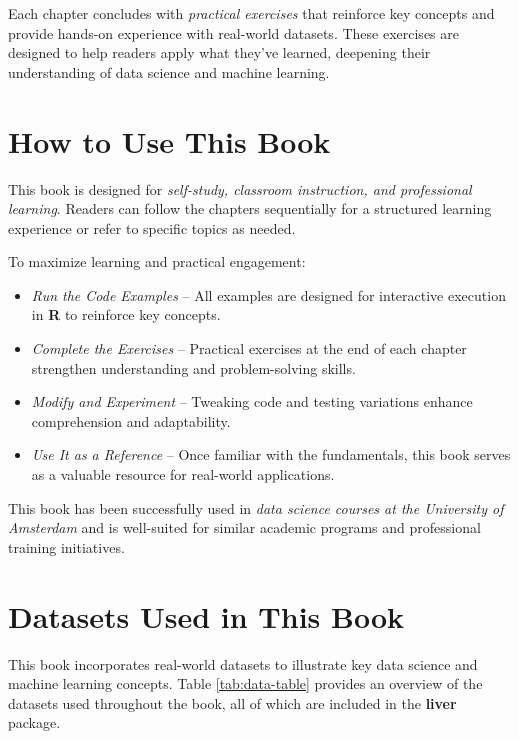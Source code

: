 \documentclass[
]{book}
\providecommand{\tightlist}{%
  \setlength{\itemsep}{0pt}\setlength{\parskip}{0pt}}
\theoremstyle{definition}
\theoremstyle{definition}
\theoremstyle{definition}
\theoremstyle{definition}
\theoremstyle{remark}
\begin{document}
Each chapter concludes with \emph{practical exercises} that reinforce key concepts and provide hands-on experience with real-world datasets. These exercises are designed to help readers apply what they've learned, deepening their understanding of data science and machine learning.

\section*{How to Use This Book}\label{how-to-use-this-book}

This book is designed for \emph{self-study, classroom instruction, and professional learning}. Readers can follow the chapters sequentially for a structured learning experience or refer to specific topics as needed.

To maximize learning and practical engagement:

\begin{itemize}
\tightlist
\item
  \emph{Run the Code Examples} -- All examples are designed for interactive execution in \textbf{R} to reinforce key concepts.\\
\item
  \emph{Complete the Exercises} -- Practical exercises at the end of each chapter strengthen understanding and problem-solving skills.\\
\item
  \emph{Modify and Experiment} -- Tweaking code and testing variations enhance comprehension and adaptability.\\
\item
  \emph{Use It as a Reference} -- Once familiar with the fundamentals, this book serves as a valuable resource for real-world applications.
\end{itemize}

This book has been successfully used in \emph{data science courses at the University of Amsterdam} and is well-suited for similar academic programs and professional training initiatives.

\section*{Datasets Used in This Book}\label{datasets-used-in-this-book}

This book incorporates real-world datasets to illustrate key data science and machine learning concepts. Table \ref{tab:data-table} provides an overview of the datasets used throughout the book, all of which are included in the \textbf{liver} package.
\end{document}
